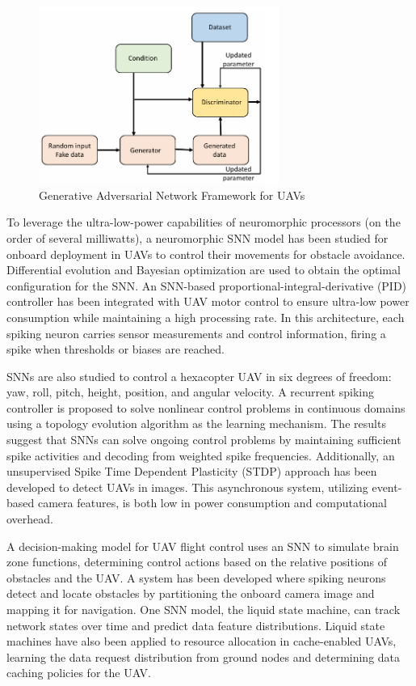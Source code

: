     \begin{figure}[H]
        \centering
        \includegraphics[width=0.7\textwidth]{Figures/Chapter2/Section1/7.png}
        \caption{Generative Adversarial Network Framework for UAVs~\cite{kurunathan2022machine}}
        \label{GAN_UAV}
    \end{figure}
    To leverage the ultra-low-power capabilities of neuromorphic processors (on the order of several milliwatts), a neuromorphic SNN model has been studied for onboard deployment in UAVs to control their movements for obstacle avoidance. Differential evolution and Bayesian optimization are used to obtain the optimal configuration for the SNN. An SNN-based proportional-integral-derivative (PID) controller has been integrated with UAV motor control to ensure ultra-low power consumption while maintaining a high processing rate. In this architecture, each spiking neuron carries sensor measurements and control information, firing a spike when thresholds or biases are reached.
    
    SNNs are also studied to control a hexacopter UAV in six degrees of freedom: yaw, roll, pitch, height, position, and angular velocity. A recurrent spiking controller is proposed to solve nonlinear control problems in continuous domains using a topology evolution algorithm as the learning mechanism. The results suggest that SNNs can solve ongoing control problems by maintaining sufficient spike activities and decoding from weighted spike frequencies. Additionally, an unsupervised Spike Time Dependent Plasticity (STDP) approach has been developed to detect UAVs in images. This asynchronous system, utilizing event-based camera features, is both low in power consumption and computational overhead.
    
    A decision-making model for UAV flight control uses an SNN to simulate brain zone functions, determining control actions based on the relative positions of obstacles and the UAV. A system has been developed where spiking neurons detect and locate obstacles by partitioning the onboard camera image and mapping it for navigation. One SNN model, the liquid state machine, can track network states over time and predict data feature distributions. Liquid state machines have also been applied to resource allocation in cache-enabled UAVs, learning the data request distribution from ground nodes and determining data caching policies for the UAV.
    

